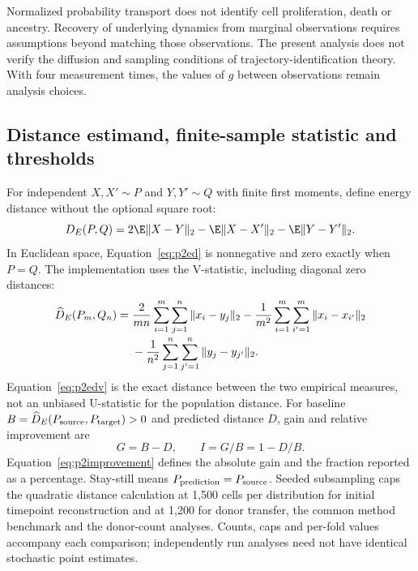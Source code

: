 \documentclass[10pt,a4paper]{article}
\begin{document}
Normalized probability transport does not identify cell proliferation, death or ancestry. Recovery of underlying dynamics from marginal observations requires assumptions beyond matching those observations. The present analysis does not verify the diffusion and sampling conditions of trajectory-identification theory. With four measurement times, the values of $g$ between observations remain analysis choices.

\subsection{Distance estimand, finite-sample statistic and thresholds}
For independent $X,X'\sim P$ and $Y,Y'\sim Q$ with finite first moments, define energy distance without the optional square root:
\begin{equation}
D_E(P,Q)=2\E\|X-Y\|_2-\E\|X-X'\|_2-\E\|Y-Y'\|_2.\label{eq:p2ed}
\end{equation}
In Euclidean space, Equation~\eqref{eq:p2ed} is nonnegative and zero exactly when $P=Q$. The implementation uses the V-statistic, including diagonal zero distances:
\begin{align}
\widehat D_E(P_m,Q_n)={}&\frac{2}{mn}\sum_{i=1}^{m}\sum_{j=1}^{n}\|x_i-y_j\|_2
-\frac1{m^2}\sum_{i=1}^{m}\sum_{i'=1}^{m}\|x_i-x_{i'}\|_2\notag\\[-2pt]
&-\frac1{n^2}\sum_{j=1}^{n}\sum_{j'=1}^{n}\|y_j-y_{j'}\|_2.\label{eq:p2edv}
\end{align}
Equation~\eqref{eq:p2edv} is the exact distance between the two empirical measures, not an unbiased U-statistic for the population distance. For baseline $B=\widehat D_E(P_{\rm source},P_{\rm target})>0$ and predicted distance $D$, gain and relative improvement are
\begin{equation}
G=B-D,\qquad I=G/B=1-D/B.\label{eq:p2improvement}
\end{equation}
Equation~\eqref{eq:p2improvement} defines the absolute gain and the fraction reported as a percentage. Stay-still means $P_{\rm prediction}=P_{\rm source}$. Seeded subsampling caps the quadratic distance calculation at 1,500 cells per distribution for initial timepoint reconstruction and at 1,200 for donor transfer, the common method benchmark and the donor-count analyses. Counts, caps and per-fold values accompany each comparison; independently run analyses need not have identical stochastic point estimates.
\end{document}
